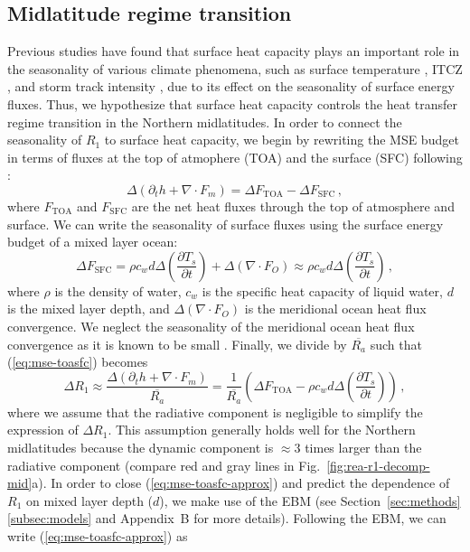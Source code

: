 \documentclass{ametsocV5}
\begin{document}
  \subsection{Midlatitude regime transition} \label{subsec:mld}

  Previous studies have found that surface heat capacity plays an important role in the seasonality of various climate phenomena, such as surface temperature \citep{donohoe2014}, ITCZ \citep{bordoni2008}, and storm track intensity \citep{barpanda2020}, due to its effect on the seasonality of surface energy fluxes. Thus, we hypothesize that surface heat capacity controls the heat transfer regime transition in the Northern midlatitudes. In order to connect the seasonality of $R_1$ to surface heat capacity, we begin by rewriting the MSE budget in terms of fluxes at the top of atmophere (TOA) and the surface (SFC) following \cite{barpanda2020}:
  \begin{equation}\label{eq:mse-toasfc}
    \Delta\left(\partial_t h + \nabla\cdot F_{m} \right) = \Delta F_{\mathrm{TOA}} - \Delta F_{\mathrm{SFC}} \, ,
  \end{equation}
  where \(F_{\mathrm{TOA}}\) and \(F_{\mathrm{SFC}}\) are the net heat fluxes through the top of atmosphere and surface. We can write the seasonality of surface fluxes using the surface energy budget of a mixed layer ocean:
  \begin{equation}
    \Delta F_{\mathrm{SFC}} = \rho c_{w} d \Delta\left(\frac{\partial T_{s}}{\partial t}\right) + \Delta ( \nabla\cdot F_{O}) \approx \rho c_{w} d \Delta\left(\frac{\partial T_{s}}{\partial t}\right) \, ,
  \end{equation}
  where $\rho$ is the density of water, $c_w$ is the specific heat capacity of liquid water, $d$ is the mixed layer depth, and $\Delta(\nabla\cdot F_O)$ is the meridional ocean heat flux convergence. We neglect the seasonality of the meridional ocean heat flux convergence as it is known to be small \citep{roberts2017}. Finally, we divide by $\overline{R_a}$ such that (\ref{eq:mse-toasfc}) becomes
  \begin{equation}\label{eq:mse-toasfc-approx}
    \Delta R_1 \approx \frac{\Delta\left(\partial_t h + \nabla\cdot F_{m} \right)}{\overline{R_a}} = \frac{1}{\overline{R_a}} \left(\Delta F_{\mathrm{TOA}} - \rho c_{w} d \Delta\left(\frac{\partial T_{s}}{\partial t}\right)\right) \, , 
  \end{equation}
  where we assume that the radiative component is negligible to simplify the expression of $\Delta R_1$. This assumption generally holds well for the Northern midlatitudes because the dynamic component is $\approx 3$ times larger than the radiative component (compare red and gray lines in Fig.~\ref{fig:rea-r1-decomp-mid}a). In order to close (\ref{eq:mse-toasfc-approx}) and predict the dependence of $R_1$ on mixed layer depth ($d$), we make use of the EBM (see Section~\ref{sec:methods}\ref{subsec:models} and Appendix~B for more details). Following the EBM, we can write (\ref{eq:mse-toasfc-approx}) as
\end{document}
